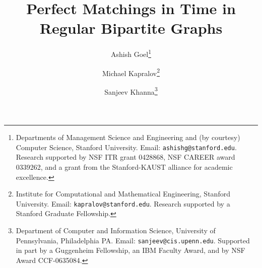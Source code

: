 \documentclass[11pt]{article}
\begin{document}
\title{\Large Perfect Matchings in  Time in Regular Bipartite Graphs}
\author{Ashish Goel\thanks{
    Departments of Management Science and Engineering and (by courtesy)
    Computer Science, Stanford University.
    Email: {\tt ashishg@stanford.edu}.
    Research supported by NSF
    ITR grant 0428868, NSF CAREER award 0339262, and a grant from the
    Stanford-KAUST alliance for academic excellence.}\\
\and Michael Kapralov\thanks{
    Institute for Computational and Mathematical Engineering, Stanford University.
    Email: {\tt kapralov@stanford.edu}. Research supported by a Stanford Graduate Fellowship.}\\   
\and Sanjeev Khanna\thanks{Department of Computer and Information Science, University of Pennsylvania,
Philadelphia PA. Email: {\tt sanjeev@cis.upenn.edu}. Supported in
part by a Guggenheim Fellowship, an IBM Faculty Award, and by NSF Award CCF-0635084.}
}
\end{document}
